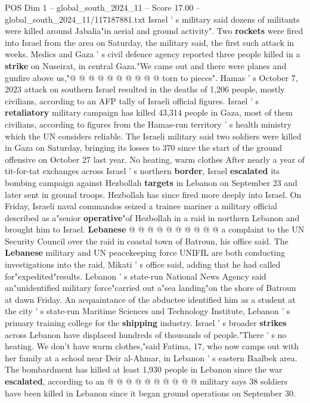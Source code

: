 \begin{textsample}{POS Dim 1 – global\_south\_2024\_11 – Score 17.00 – global\_south\_2024\_11/117187881.txt}
Israel ' s military said dozens of militants were killed around Jabalia"in aerial and ground activity".
Two \textbf{rockets} were fired into Israel from the area on Saturday, the military said, the first such attack in weeks.
Medics and Gaza ' s civil defence agency reported three people killed in a \textbf{strike} on Nuseirat, in central Gaza."We came out and there were planes and gunfire above us,"@ @ @ @ @ @ @ @ @ @ torn to pieces".
Hamas ' s October 7, 2023 attack on southern Israel resulted in the deaths of 1,206 people, mostly civilians, according to an AFP tally of Israeli official figures.
Israel ' s \textbf{retaliatory} military campaign has killed 43,314 people in Gaza, most of them civilians, according to figures from the Hamas-run territory ' s health ministry which the UN considers reliable.
The Israeli military said two soldiers were killed in Gaza on Saturday, bringing its losses to 370 since the start of the ground offensive on October 27 last year.
No heating, warm clothes After nearly a year of tit-for-tat exchanges across Israel ' s northern \textbf{border}, Israel \textbf{escalated} its bombing campaign against Hezbollah \textbf{targets} in Lebanon on September 23 and later sent in ground troops.
Hezbollah has since fired more deeply into Israel.
On Friday, Israeli naval commandos seized a trainee mariner a military official described as a"senior \textbf{operative}"of Hezbollah in a raid in northern Lebanon and brought him to Israel. \textbf{Lebanese} @ @ @ @ @ @ @ @ @ @ a complaint to the UN Security Council over the raid in coastal town of Batroun, his office said.
The \textbf{Lebanese} military and UN peacekeeping force UNIFIL are both conducting investigations into the raid, Mikati ' s office said, adding that he had called for"expedited"results.
Lebanon ' s state-run National News Agency said an"unidentified military force"carried out a"sea landing"on the shore of Batroun at dawn Friday.
An acquaintance of the abductee identified him as a student at the city ' s state-run Maritime Sciences and Technology Institute, Lebanon ' s primary training college for the \textbf{shipping} industry.
Israel ' s broader \textbf{strikes} across Lebanon have displaced hundreds of thousands of people."There ' s no heating.
We don't have warm clothes,"said Fatima, 17, who now camps out with her family at a school near Deir al-Ahmar, in Lebanon ' s eastern Baalbek area.
The bombardment has killed at least 1,930 people in Lebanon since the war \textbf{escalated}, according to an @ @ @ @ @ @ @ @ @ @ military says 38 soldiers have been killed in Lebanon since it began ground operations on September 30.

\end{textsample}
